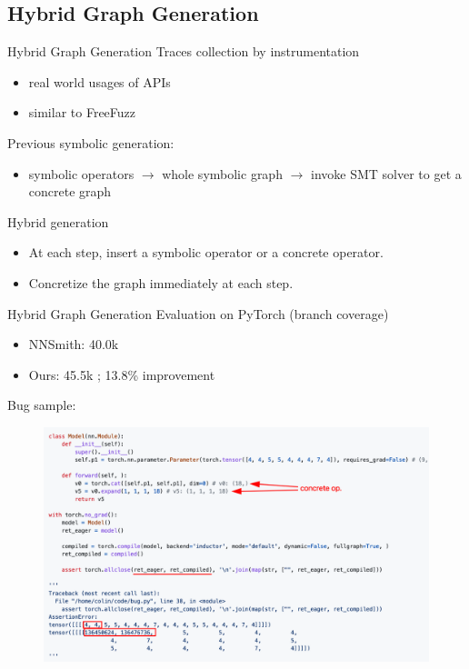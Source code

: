 \documentclass{beamer}
\begin{document}
\subsection{Hybrid Graph Generation}
\begin{frame}{Hybrid Graph Generation}
    Traces collection by instrumentation
    \begin{itemize}
        \item real world usages of APIs
        \item similar to FreeFuzz
    \end{itemize}
    Previous symbolic generation:
    \begin{itemize}
        \item symbolic operators $\rightarrow$ whole symbolic graph $\rightarrow$ invoke SMT solver to get a concrete graph
    \end{itemize}
    Hybrid generation
    \begin{itemize}
        \item At each step, insert a symbolic operator or a concrete operator.
        \item Concretize the graph immediately at each step.
    \end{itemize}
\end{frame}

\begin{frame}[fragile]{Hybrid Graph Generation}
    Evaluation on PyTorch (branch coverage)
    \begin{itemize}
        \item NNSmith: 40.0k %
        \item Ours: 45.5k ; 13.8\% improvement
    \end{itemize}
    Bug sample:
    \begin{figure}
        \centering
        \includegraphics[scale=0.14]{figs/bug_sample.png}
        \label{fig:bug_sample}
    \end{figure}
\end{frame}
\end{document}
